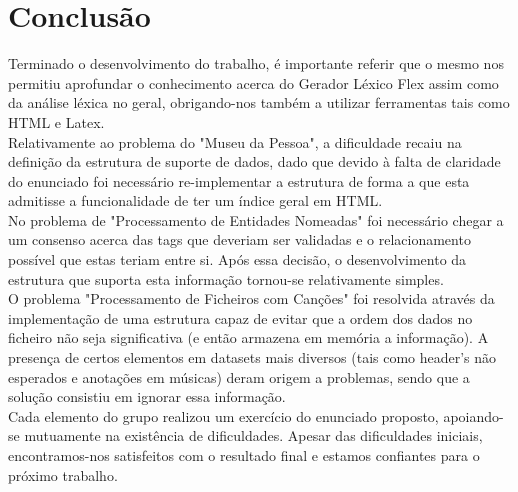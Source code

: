 \documentclass[a4paper,10pt]{report}
\begin{document}




\chapter{Conclusão}
\label{cap:intro}
Terminado o desenvolvimento do trabalho, é importante referir que o mesmo nos permitiu aprofundar o conhecimento acerca do Gerador Léxico Flex assim como da análise léxica no geral, obrigando-nos também a utilizar ferramentas tais como HTML e Latex.\\
Relativamente ao problema do "Museu da Pessoa", a dificuldade recaiu na definição da estrutura de suporte de dados, dado que devido à falta de claridade do enunciado foi necessário re-implementar a estrutura de forma a que esta admitisse a funcionalidade de ter um índice geral em HTML.\\
No problema de "Processamento de Entidades Nomeadas" foi necessário chegar a um consenso acerca das tags que deveriam ser validadas e o relacionamento possível que estas teriam entre si. Após essa decisão, o desenvolvimento da estrutura que suporta esta informação tornou-se relativamente simples.\\
O problema "Processamento de Ficheiros com Canções" foi resolvida através da implementação de uma estrutura capaz de evitar que a ordem dos dados no ficheiro não seja significativa (e então armazena em memória a informação). A presença de certos elementos em datasets mais diversos (tais como header's não esperados e anotações em músicas) deram origem a problemas, sendo que a solução consistiu em ignorar essa informação. \\
Cada elemento do grupo realizou um exercício do enunciado proposto, apoiando-se mutuamente na existência de dificuldades. Apesar das dificuldades iniciais, encontramos-nos satisfeitos com o resultado final e estamos confiantes para o próximo trabalho.


\end{document}

